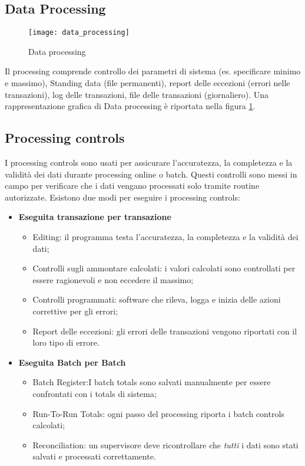 \subsection{Data Processing}

\begin{figure}[h!]
        \begin{center}
                \texttt{[image: data\_processing]}
        \end{center}
        \caption{Data processing}
        \label{fig:data:processing}
\end{figure}

Il processing comprende controllo dei parametri di sistema (es. specificare
minimo e massimo), Standing data (file permanenti), report delle eccezioni
(errori nelle transazioni), log delle transazioni, file delle transazioni
(giornaliero). Una rappresentazione grafica di Data processing è riportata
nella figura \ref{fig:data:processing}.

\subsection{Processing controls}
I processing controls sono usati per assicurare
l'accuratezza, la completezza e la validità dei dati durante
processing online o batch. Questi controlli sono messi in campo
per verificare che i dati vengano processati solo tramite routine
autorizzate. Esistono due modi per eseguire i processing controls:

\begin{itemize}
\item \textbf{Eseguita transazione per transazione}
\begin{itemize}
\item Editing: il programma testa l'accuratezza, la completezza
e la validità dei dati;
\item Controlli sugli ammontare calcolati: i valori calcolati
sono controllati per essere ragionevoli e non eccedere il massimo;
\item Controlli programmati: software che rileva, logga e inizia
delle azioni correttive per gli errori;
\item Report delle eccezioni: gli errori delle transazioni vengono
riportati con il loro tipo di errore.
\end{itemize}

\item \textbf{Eseguita Batch per Batch}

\begin{itemize}
\item Batch Register:I batch totals sono salvati manualmente per essere
confrontati con i totals di sistema;
\item Run-To-Run Totals: ogni passo del processing riporta i batch
controls calcolati;
\item Reconciliation: un supervisore deve ricontrollare che \emph{tutti}
i dati sono stati salvati e processati correttamente.
\end{itemize}
\end{itemize}


